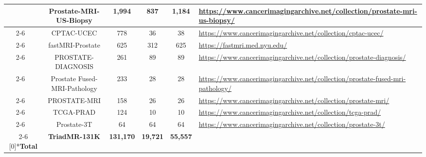 \begin{table}[!h]
{\begin{tabular}{ccccc m{9cm}}
		~ & Prostate-MRI-US-Biopsy & 1,994 & 837 & 1,184 & \url{https://www.cancerimagingarchive.net/collection/prostate-mri-us-biopsy/} \\ \cline{2-6}
		~ & CPTAC-UCEC & 778 & 36 & 38 & \url{https://www.cancerimagingarchive.net/collection/cptac-ucec/} \\ \cline{2-6}
		~ & fastMRI-Prostate & 625 & 312 & 625 & \url{https://fastmri.med.nyu.edu/} \\ \cline{2-6}
		~ & PROSTATE-DIAGNOSIS & 261 & 89 & 89 & \url{https://www.cancerimagingarchive.net/collection/prostate-diagnosis/} \\ \cline{2-6}
		~ & Prostate Fused-MRI-Pathology & 233 & 28 & 28 & \url{https://www.cancerimagingarchive.net/collection/prostate-fused-mri-pathology/} \\ \cline{2-6}
		~ & PROSTATE-MRI & 158 & 26 & 26 & \url{https://www.cancerimagingarchive.net/collection/prostate-mri/} \\ \cline{2-6}
		~ & TCGA-PRAD & 124 & 10 & 10 & \url{https://www.cancerimagingarchive.net/collection/tcga-prad/} \\ \cline{2-6}
		~ & Prostate-3T & 64 & 64 & 64 & \url{https://www.cancerimagingarchive.net/collection/prostate-3t/} \\ 	\cline{2-6}		
	 \hline
	 \multirow{1}[0]{*}{\textbf{Total}} & \textbf{TriadMR-131K} & \textbf{131,170} & \textbf{19,721} & \textbf{55,557} & ~ \\ 
	 \hline
	\end{tabular}}
\end{table}
